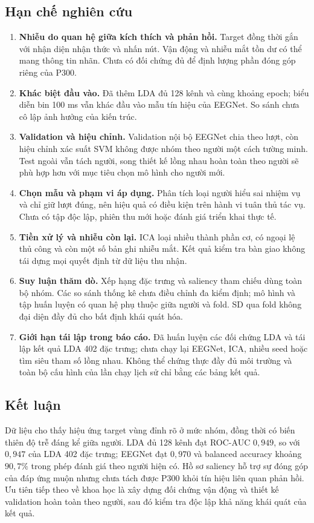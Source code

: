 \documentclass[11pt,a4paper]{article}
\begin{document}
\subsection{Hạn chế nghiên cứu}
\begin{enumerate}
\item \textbf{Nhiễu do quan hệ giữa kích thích và phản hồi.} Target đồng thời gắn với nhận diện nhận thức và nhấn nút. Vận động và nhiễu mắt tồn dư có thể mang thông tin nhãn. Chưa có đối chứng đủ để định lượng phần đóng góp riêng của P300.
\item \textbf{Khác biệt đầu vào.} Đã thêm LDA đủ 128 kênh và cùng khoảng epoch; biểu diễn bin 100 ms vẫn khác đầu vào mẫu tín hiệu của EEGNet. So sánh chưa cô lập ảnh hưởng của kiến trúc.
\item \textbf{Validation và hiệu chỉnh.} Validation nội bộ EEGNet chia theo lượt, còn hiệu chỉnh xác suất SVM không được nhóm theo người một cách tường minh. Test ngoài vẫn tách người, song thiết kế lồng nhau hoàn toàn theo người sẽ phù hợp hơn với mục tiêu chọn mô hình cho người mới.
\item \textbf{Chọn mẫu và phạm vi áp dụng.} Phân tích loại người hiểu sai nhiệm vụ và chỉ giữ lượt đúng, nên hiệu quả có điều kiện trên hành vi tuân thủ tác vụ. Chưa có tập độc lập, phiên thu mới hoặc đánh giá triển khai thực tế.
\item \textbf{Tiền xử lý và nhiễu còn lại.} ICA loại nhiều thành phần cơ, có ngoại lệ thủ công và còn một số bản ghi nhiễu mắt. Kết quả kiểm tra bàn giao không tái dựng mọi quyết định từ dữ liệu thu nhận.
\item \textbf{Suy luận thăm dò.} Xếp hạng đặc trưng và saliency tham chiếu dùng toàn bộ nhóm. Các so sánh thống kê chưa điều chỉnh đa kiểm định; mô hình và tập huấn luyện có quan hệ phụ thuộc giữa người và fold. SD qua fold không đại diện đầy đủ cho bất định khái quát hóa.
\item \textbf{Giới hạn tái lập trong báo cáo.} Đã huấn luyện các đối chứng LDA và tái lập kết quả LDA 402 đặc trưng; chưa chạy lại EEGNet, ICA, nhiều seed hoặc tìm siêu tham số lồng nhau. Không thể chứng thực đầy đủ môi trường và toàn bộ cấu hình của lần chạy lịch sử chỉ bằng các bảng kết quả.
\end{enumerate}

\subsection{Kết luận}
Dữ liệu cho thấy hiệu ứng target vùng đỉnh rõ ở mức nhóm, đồng thời có biến thiên độ trễ đáng kể giữa người. LDA đủ 128 kênh đạt ROC-AUC $0{,}949$, so với $0{,}947$ của LDA 402 đặc trưng; EEGNet đạt $0{,}970$ và balanced accuracy khoảng $90{,}7\%$ trong phép đánh giá theo người hiện có. Hồ sơ saliency hỗ trợ sự đóng góp của đáp ứng muộn nhưng chưa tách được P300 khỏi tín hiệu liên quan phản hồi. Ưu tiên tiếp theo về khoa học là xây dựng đối chứng vận động và thiết kế validation hoàn toàn theo người, sau đó kiểm tra độc lập khả năng khái quát của kết quả.
\FloatBarrier
\end{document}

